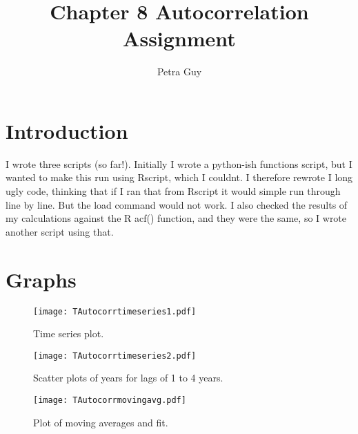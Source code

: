 \documentclass[a4paper]{article}
\title{Chapter 8 Autocorrelation Assignment}
\author{Petra Guy}
\begin{document}
\maketitle

\section{Introduction}
I wrote three scripts (so far!). Initially I wrote a python-ish functions script, 
but I wanted to make this run using Rscript, which I couldnt.
 I therefore rewrote I long ugly code, thinking that if I ran that
  from Rscript it would simple run through line by line. But the 
  load command would not work. I also checked the results of my 
  calculations against the R acf() function, and they were the same, 
  so I wrote another script using that. 

\section{Graphs}

\begin{figure}

\centering
\texttt{[image: TAutocorrtimeseries1.pdf]}
\caption{\label{fig:TAutocorrtimeseries1.pdf}Time series plot.}

\centering
\texttt{[image: TAutocorrtimeseries2.pdf]}
\caption{\label{fig:TAutocorrtimeseries2.pdf}Scatter plots of years for lags of 1 to 4 years.}

\centering
\texttt{[image: TAutocorrmovingavg.pdf]}
\caption{\label{fig:TAutocorrmovingavg.pdf}Plot of moving averages and fit.}
\end{figure}



\clearpage
\newpage
\mbox{~}
\clearpage
\newpage
\end{document}
